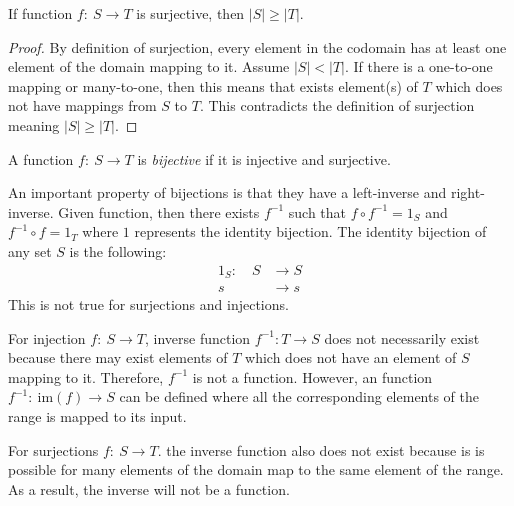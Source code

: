 \bigskip
\begin{proposition}
    If function \(f:\: S\rightarrow T\) is surjective, then \(|S|\ge|T|\).
\end{proposition}
\begin{proof}
    By definition of surjection, every element in the codomain has at least one element of the domain mapping to it. Assume \(|S|< |T|\).
    If there is a one-to-one mapping or many-to-one, then this means that exists element(s) of \(T\) which does not have mappings from
    \(S\) to \(T\). This contradicts the definition of surjection meaning \(|S|\ge|T|\). 
\end{proof}

\bigskip
\begin{definition}
    A function \(f:\: S\rightarrow T\) is \emph{bijective} if it is injective and surjective. 
\end{definition}

An important property of bijections is that they have a left-inverse and right-inverse. Given function, then there exists 
\(f^{-1}\) such that \(f\circ f^{-1}=1_S\) and \(f^{-1}\circ f=1_T\) where \(1\) represents the identity bijection. 
The identity bijection of any set \(S\) is the following:
\begin{align*}
    1_S:\quad S&\longrightarrow S \\
            s&\longrightarrow s
\end{align*}
This is not true for surjections and injections.

For injection \(f:\:S\rightarrow T\), inverse function \(f^{-1}: T\rightarrow S\) does
not necessarily exist because there may exist elements of \(T\) which does not have an element of \(S\) mapping to it. Therefore, \(f^{-1}\)
is not a function. However, an function \(f^{-1}:\:\text{im}(f)\rightarrow S\) can be defined where all the corresponding elements of the range
is mapped to its input.

For surjections \(f:\:S\rightarrow T\). the inverse function also does not exist because is is possible for many elements of the domain map to the
same element of the range. As a result, the inverse will not be a function.

